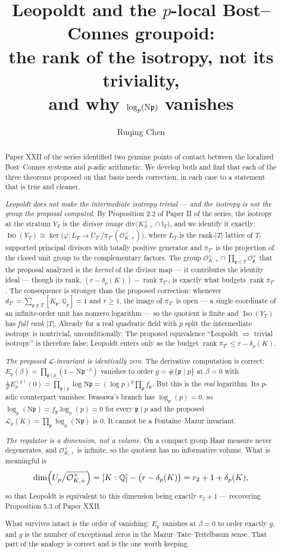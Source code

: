 \documentclass[11pt]{amsart}
\title[Leopoldt, the strata, and $\log_p(\Ns\pp)=0$]{Leopoldt and the $p$-local Bost--Connes groupoid:\\ the rank of the isotropy, not its triviality,\\ and why $\log_p(\Ns\pp)$ vanishes}
\author{Ruqing Chen}
\date{}
\numberwithin{equation}{section}
\theoremstyle{definition}
\theoremstyle{remark}
\newcommand{\Q}{\mathbb{Q}}
\newcommand{\cO}{\mathcal{O}}
\newcommand{\cL}{\mathcal{L}}
\newcommand{\pp}{\mathfrak{p}}
\newcommand{\Ns}{\mathrm{N}}
\newcommand{\Iso}{\operatorname{Iso}}
\newcommand{\Idl}{\mathbb{I}}
\newcommand{\rank}{\operatorname{rank}}
\begin{document}
\begin{abstract}
Paper XXII of the series identified two genuine points of contact between the localized
Bost--Connes systems and $p$-adic arithmetic. We develop both and find that each of the three
theorems proposed on that basis needs correction, in each case to a statement that is true and
cleaner.

\emph{Leopoldt does not make the intermediate isotropy trivial --- and the isotropy is not
the group the proposal computed.} By Proposition 2.2 of Paper II of the series, the isotropy
at the stratum $Y_T$ is the \emph{divisor image}
$\mathrm{div}\bigl(\overline{K^\times_{S,+}}\cap\Idl_T\bigr)$, and we identify it exactly:
$\Iso(Y_T)\cong\ker\bigl(\varphi:L_T\to U_{T^c}/\pi_{T^c}(\overline{\cO^\times_{K,+}})\bigr)$,
where $L_T$ is the rank-$|T|$ lattice of $T$-supported principal divisors with totally
positive generator and $\pi_{T^c}$ is the projection of the closed unit group to the
complementary factors. The group $\overline{\cO^\times_{K,+}}\cap\prod_{\pp\in T}\cO_\pp^\times$
that the proposal analyzed is the \emph{kernel} of the divisor map --- it contributes the
identity ideal --- though its rank, $(r-\delta_p(K))-\rank\pi_{T^c}$, is exactly what budgets
$\rank\pi_{T^c}$. The consequence is stronger than the proposed correction: whenever
$d_{T^c}=\sum_{\pp\notin T}[K_\pp:\Q_p]=1$ and $r\ge1$, the image of $\pi_{T^c}$ is open ---
a single coordinate of an infinite-order unit has nonzero logarithm --- so the quotient is
finite and $\Iso(Y_T)$ has \emph{full rank} $|T|$. Already for a real quadratic field with
$p$ split the intermediate isotropy is nontrivial, unconditionally. The proposed equivalence
``Leopoldt $\iff$ trivial isotropy'' is therefore false; Leopoldt enters only as the budget
$\rank\pi_{T^c}\le r-\delta_p(K)$.

\emph{The proposed $\cL$-invariant is identically zero.} The derivative computation is
correct: $E_p(\beta)=\prod_{\pp\mid p}(1-\Ns\pp^{-\beta})$ vanishes to order $g=\#\{\pp\mid p\}$
at $\beta=0$ with
$\frac{1}{g!}E_p^{(g)}(0)=\prod_{\pp\mid p}\log\Ns\pp=(\log p)^g\prod_\pp f_\pp$. But this is
the \emph{real} logarithm. Its $p$-adic counterpart vanishes: Iwasawa's branch has
$\log_p(p)=0$, so $\log_p(\Ns\pp)=f_\pp\log_p(p)=0$ for every $\pp\mid p$ and the proposed
$\cL_p(K)=\prod_\pp\log_p(\Ns\pp)$ is $0$. It cannot be a Fontaine--Mazur invariant.

\emph{The regulator is a dimension, not a volume.} On a compact group Haar measure never
degenerates, and $\overline{\cO^\times_{K,+}}$ is infinite, so the quotient has no
informative volume. What is meaningful is
\[
\dim\Bigl(U_p\big/\overline{\cO^\times_{K,+}}\Bigr)=[K:\Q]-\bigl(r-\delta_p(K)\bigr)=r_2+1+\delta_p(K),
\]
so that Leopoldt is equivalent to this dimension being exactly $r_2+1$ --- recovering
Proposition 5.3 of Paper XXII.

What survives intact is the order of vanishing: $E_p$ vanishes at $\beta=0$ to order exactly
$g$, and $g$ is the number of exceptional zeros in the Mazur--Tate--Teitelbaum sense. That
part of the analogy is correct and is the one worth keeping.
\end{abstract}
\end{document}
